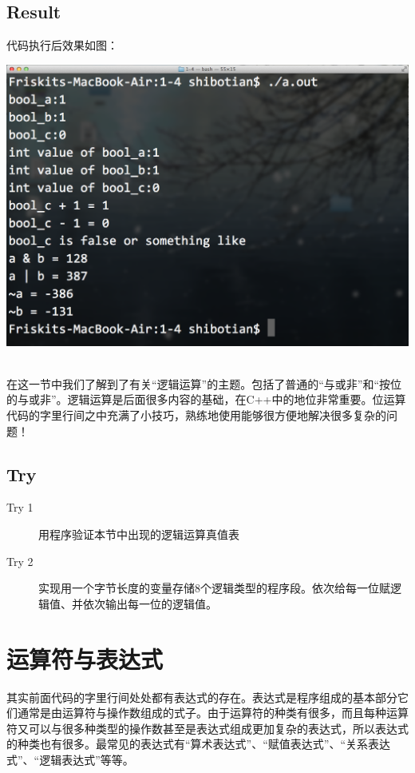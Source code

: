 \subsection{Result}
代码执行后效果如图：
\\[\intextsep] 
  \begin{minipage}{\textwidth} 
    \centering 
    \includegraphics{codes/1-4/result.png}
    \label{fig:code-1-4-result} 
  \end{minipage} 
\\[\intextsep]

在这一节中我们了解到了有关“逻辑运算”的主题。包括了普通的“与或非”和“按位的与或非”。逻辑运算是后面很多内容的基础，在C++中的地位非常重要。位运算代码的字里行间之中充满了小技巧，熟练地使用能够很方便地解决很多复杂的问题！
\subsection{Try}
\begin{description}
	\item[Try 1]用程序验证本节中出现的逻辑运算真值表
	\item[Try 2]实现用一个字节长度的变量存储8个逻辑类型的程序段。依次给每一位赋逻辑值、并依次输出每一位的逻辑值。
\end{description}

\section{运算符与表达式}
其实前面代码的字里行间处处都有表达式的存在。表达式是程序组成的基本部分它们通常是由运算符与操作数组成的式子。由于运算符的种类有很多，而且每种运算符又可以与很多种类型的操作数甚至是表达式组成更加复杂的表达式，所以表达式的种类也有很多。最常见的表达式有“算术表达式”、“赋值表达式”、“关系表达式”、“逻辑表达式”等等。

